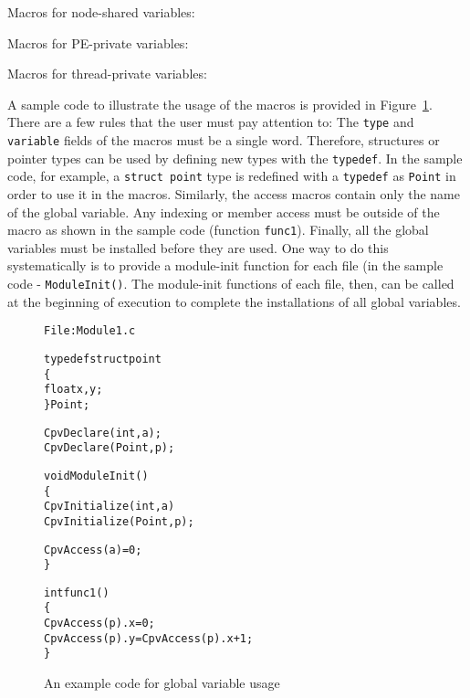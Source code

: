 Macros for node-shared variables:



Macros for PE-private variables:



Macros for thread-private variables:




A sample code to illustrate the usage of the macros is provided
in Figure~\ref{fig:cpv}.
There are a few rules that the user must pay attention to: The
{\tt type} and {\tt variable} fields of the macros must be a single
word. Therefore, structures or pointer types can be used by defining
new types with the {\tt typedef}. In the sample code, for example,
a {\tt struct point} type is redefined with a {\tt typedef} as {\tt Point}
in order to use it in the macros. Similarly,  the access macros contain
only the name of the global variable. Any indexing or member access
must be outside of the macro as shown in the sample code 
(function {\tt func1}). Finally, all the global variables must be
installed before they are used. One way to do this systematically is
to provide a module-init function for each file (in the sample code - 
{\tt ModuleInit()}. The module-init functions of each file, then, can be 
called at the beginning of execution to complete the installations of 
all global variables.

\begin{figure}
\begin{alltt}
File: Module1.c

    typedef struct point
    \{
         float x,y;
    \} Point;


    CpvDeclare(int, a);
    CpvDeclare(Point, p);

    void ModuleInit()
    \{
         CpvInitialize(int, a)
         CpvInitialize(Point, p);

         CpvAccess(a) = 0;
    \}

    int func1() 
    \{
         CpvAccess(p).x = 0;
         CpvAccess(p).y = CpvAccess(p).x + 1;
    \}
\end{alltt}
\caption{An example code for global variable usage}
\label{fig:cpv}
\end{figure}

